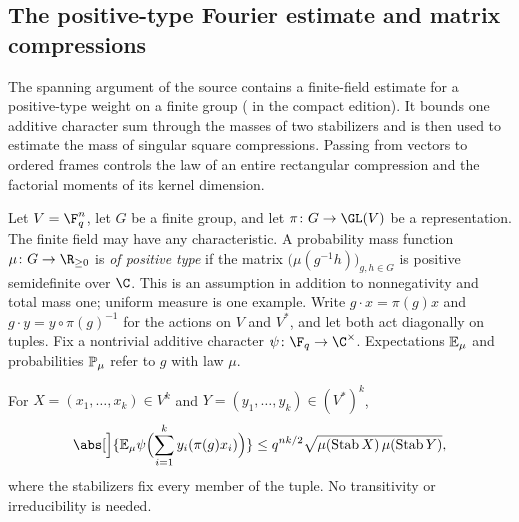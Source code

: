 \subsection{The positive-type Fourier estimate and matrix compressions}\label{spn:sec:positive-type}

The spanning argument of the source contains a finite-field estimate for a
positive-type weight on a finite group ( in the
compact edition). It bounds one additive character sum through the masses of
two stabilizers and is then used to estimate the mass of singular square
compressions. Passing
from vectors to ordered frames controls the law of an entire rectangular
compression and the factorial moments of its kernel dimension.

Let $V=\F_q^n$, let $G$ be a finite group, and let $\pi\colon G\to\GL(V)$ be a
representation. The finite field may have any characteristic. A probability
mass function $\mu\colon G\to\R_{\ge0}$ is \emph{of positive type} if the
matrix $\bigl(\mu(g^{-1}h)\bigr)_{g,h\in G}$ is positive semidefinite over
$\C$. This is an assumption in addition to nonnegativity and total mass one;
uniform measure is one example. Write $g\cdot x=\pi(g)x$ and
$g\cdot y=y\circ\pi(g)^{-1}$ for the actions on $V$ and $V^*$, and let both act
diagonally on tuples. Fix a nontrivial additive character
$\psi\colon\F_q\to\C^\times$. Expectations $\mathbb{E}_\mu$ and probabilities
$\mathbb{P}_\mu$ refer to $g$ with law $\mu$.

\begin{lemma}\label{spn:lem:positive-coefficient}
For $X=(x_1,\dots,x_k)\in V^k$ and $Y=(y_1,\dots,y_k)\in(V^*)^k$,
\begin{equation}\label{spn:eq:frame-coefficient}
 \abs[\Big]{\spnE_\mu\psi\Bigl(\sum_{i=1}^ky_i(\pi(g)x_i)\Bigr)}
 \le q^{nk/2}\sqrt{\mu(\spnStab X)\,\mu(\spnStab Y)} ,
\end{equation}
where the stabilizers fix every member of the tuple. No transitivity or
irreducibility is needed.
\end{lemma}

